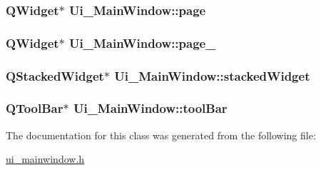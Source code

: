 \hypertarget{classUi__MainWindow_ad7d164376bef8649ee1f94697b859417}{
\subsubsection[{page}]{\setlength{\rightskip}{0pt plus 5cm}Q\-Widget$\ast$ Ui\-\_\-\-Main\-Window\-::page}}\label{classUi__MainWindow_ad7d164376bef8649ee1f94697b859417}
\hypertarget{classUi__MainWindow_adcb6de4cebc6760fe319711f125010cc}{
\subsubsection[{page\-\_\-2}]{\setlength{\rightskip}{0pt plus 5cm}Q\-Widget$\ast$ Ui\-\_\-\-Main\-Window\-::page\-\_}}\label{classUi__MainWindow_adcb6de4cebc6760fe319711f125010cc}
\hypertarget{classUi__MainWindow_a8d440a6df1de0bc57afcdda7476d8f19}{
\subsubsection[{stacked\-Widget}]{\setlength{\rightskip}{0pt plus 5cm}Q\-Stacked\-Widget$\ast$ Ui\-\_\-\-Main\-Window\-::stacked\-Widget}}\label{classUi__MainWindow_a8d440a6df1de0bc57afcdda7476d8f19}
\hypertarget{classUi__MainWindow_ab84dc49349f514d7b7d3fe8e78de069b}{
\subsubsection[{tool\-Bar}]{\setlength{\rightskip}{0pt plus 5cm}Q\-Tool\-Bar$\ast$ Ui\-\_\-\-Main\-Window\-::tool\-Bar}}\label{classUi__MainWindow_ab84dc49349f514d7b7d3fe8e78de069b}


The documentation for this class was generated from the following file\-:\begin{DoxyCompactItemize}
\item 
\hyperlink{ui__mainwindow_8h}{ui\-\_\-mainwindow.\-h}\end{DoxyCompactItemize}
